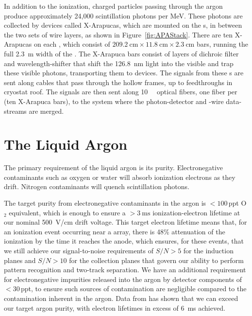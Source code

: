 In addition to the ionization, charged particles passing through the argon produce approximately 24,000 scintillation photons per \si{\mega\electronvolt}. These photons are collected by devices called X-Arapucas, which are mounted on the s, in between the two sets of wire layers, as shown in Figure~\ref{fig:APAStack}. There are ten X-Arapucas on each , which consist of $\SI{209.2}{\cm}\times\SI{11.8}{\cm}\times\SI{2.3}{\cm}$ bars, running the full \SI{2.3}{\meter} width of the . The X-Arapuca bars consist of layers of dichroic filter and wavelength-shifter that shift the \SI{126.8}{\nano\meter} light into the visible and trap these visible photons, transporting them to  devices. The signals from these s are sent along cables that pass through the hollow  frames, up to feedthroughs in cryostat roof. The signals are then sent along \SI{10}{\giga\byte} optical fibers, one fiber per  (ten X-Arapuca bars), to the  system where the photon-detector and -wire data-streams are merged.

\section{The Liquid Argon}
\label{sec:fdsp-exec-liquidargon}

The primary requirement of the liquid argon is its purity. Electronegative contaminants such as oxygen or water will absorb ionization electrons as they drift. Nitrogen contaminants will quench scintillation photons.

The target purity from electronegative contaminants in the argon is $<\!100$\,ppt O$_{2}$ equivalent, which is enough to ensure a $>\!\SI{3}{\milli\second}$ ionization-electron lifetime at our nominal \SI{500}{\volt/\centi\meter} drift voltage. This target electron lifetime means that, for an ionization event occurring near a  array, there is 48\% attenuation of the ionization by the time it reaches the anode, which ensures, for these events, that we still achieve our signal-to-noise requirements of $S/N>5$ for the induction planes and $S/N>10$
for the collection planes that govern our ability to perform pattern recognition and two-track separation. We have an additional requirement for electronegative impurities released into the argon by detector components of $<\!30$\,ppt, to ensure such sources of contamination are negligible compared to the contamination inherent in the argon. Data from  has shown that we can exceed our target argon purity, with electron lifetimes in excess of \SI{6}{\milli\second} achieved.

